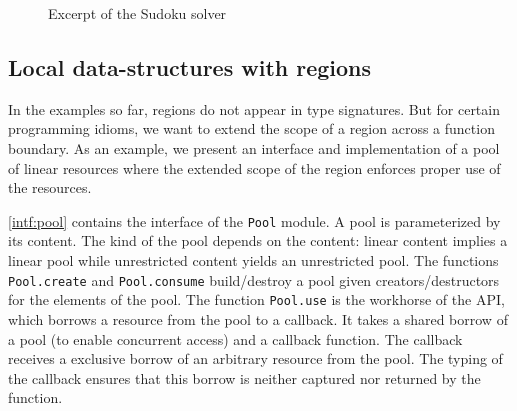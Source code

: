 \begin{figure}
  \centering
  
    \vspace{-15pt}
  \caption{Excerpt of the Sudoku solver}
  \label{ex:sudoku}
\end{figure}




\subsection{Local data-structures with regions}
\label{tuto:pool}

In the examples so far, regions do not appear in type signatures.
But for certain programming idioms, we want to extend the scope of a
region across a function boundary. As an example,
we present an interface and implementation of a pool of linear resources where the
extended scope of the region enforces proper use of the resources.

\cref{intf:pool} contains the interface of the \lstinline/Pool/ module.
A pool is parameterized by its content. The kind of the pool
depends on the content: linear content implies
a linear pool while unrestricted content yields an unrestricted pool.
The functions \lstinline/Pool.create/ and \lstinline/Pool.consume/
build/destroy a pool given creators/destructors for the elements
of the pool.
The function \lstinline/Pool.use/ is the workhorse of the API, which
borrows a resource from the pool to a callback.
It takes a shared borrow of a pool (to enable concurrent access) and a
callback function.
The callback receives a exclusive borrow of an arbitrary resource from the pool.
The typing of the callback ensures
that this borrow is neither captured nor returned by the function.

